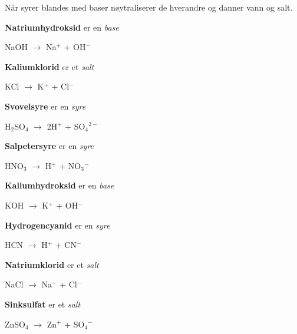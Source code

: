
Når syrer blandes med baser nøytraliserer de hverandre og danner vann og salt.

\vskip 10pt

{\bf Natriumhydroksid} er en {\it base}

NaOH $\to$ Na$^{+}$ + OH$^{-}$

\vskip 10pt

{\bf Kaliumklorid} er et {\it salt}

KCl $\to$ K$^{+}$ + Cl$^{-}$

\vskip 10pt

{\bf Svovelsyre} er en {\it syre}

H$_{2}$SO$_{4}$ $\to$ 2H$^{+}$ + SO$_{4}$$^{2-}$

\vskip 10pt

{\bf Salpetersyre} er en {\it syre}

HNO$_{3}$ $\to$ H$^{+}$ + NO$_{3}$$^{-}$

\vskip 10pt

{\bf Kaliumhydroksid} er en {\it base}

KOH $\to$ K$^{+}$ + OH$^{-}$

\vskip 10pt

{\bf Hydrogencyanid} er en {\it syre}

HCN $\to$ H$^{+}$ + CN$^{-}$

\vskip 10pt

{\bf Natriumklorid} er et {\it salt}

NaCl $\to$ Na$^{+}$ + Cl$^{-}$

\vskip 10pt

{\bf Sinksulfat} er et {\it salt}

ZnSO$_{4}$ $\to$ Zn$^{+}$ + SO$_{4}$$^{-}$



